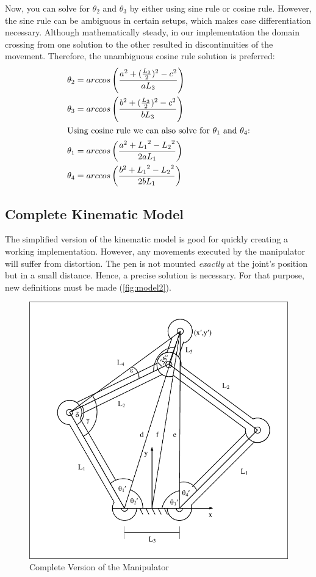 \documentclass{sig-alternate-05-2015}
\begin{document}
Now, you can solve for $\theta_2$ and $\theta_3$ by either using sine rule or cosine rule. However, the sine rule can be ambiguous in certain setups, which makes case differentiation necessary. Although mathematically steady, in our implementation the domain crossing from one solution to the other resulted in discontinuities of the movement. Therefore, the unambiguous cosine rule solution is preferred:
\begin{align*}
\theta_2 &= arccos\left(  \frac{a^2 + (\frac{L_3}{2})^2 - c^2}{aL_3} \right)\\
\theta_3 &= arccos\left(  \frac{b^2 + (\frac{L_3}{2})^2 - c^2}{bL_3} \right)\\
\intertext{Using cosine rule we can also solve for $\theta_1$ and $\theta_4$:}
\theta_1 &= arccos\left(  \frac{a^2 + {L_1}^2 - {L_2}^2}{2aL_1} \right)\\
\theta_4 &= arccos\left(  \frac{b^2 + {L_1}^2 - {L_2}^2}{2bL_1} \right)
\end{align*}

\subsection{Complete Kinematic Model}
The simplified version of the kinematic model is good for quickly creating a working implementation. However, any movements executed by the manipulator will suffer from distortion. The pen is not mounted \emph{exactly} at the joint's position but in a small distance. Hence, a precise solution is necessary. For that purpose, new definitions must be made (\autoref{fig:model2}).
\begin{figure}[!h]
	\centering
	\includegraphics[width=.42\textwidth]{img/LinkDiagramComplicated_try.pdf}
	\caption{Complete Version of the Manipulator}\label{fig:model2}
\end{figure}
\end{document}
